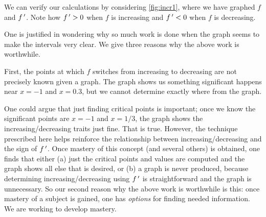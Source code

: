 \begin{example}

We can verify our calculations by considering \autoref{fig:incr1}, where we have graphed $f$ and $f\,'$. Note how $f\,'>0$ when $f$ is increasing and $f\,'<0$ when $f$ is decreasing.
\end{example}

One is justified in wondering why so much work is done when the graph seems to make the intervals very clear. We give three reasons why the above work is worthwhile.

First, the points at which $f$ switches from increasing to decreasing are not precisely known given a graph. The graph shows us something significant happens near $x=-1$ and $x=0.3$, but we cannot determine exactly where from the graph. 

One could argue that just finding critical points is important; once we know the significant points are $x=-1$ and $x=1/3$, the graph shows the increasing/decreasing traits just fine. That is true. However, the technique prescribed here helps reinforce the relationship between increasing/decreasing and the sign of $f\,'$. Once mastery of this concept (and several others) is obtained, one finds that either (a) just the critical points and values are computed and the graph shows all else that is desired, or (b) a graph is never produced, because determining increasing/decreasing using $f\,'$ is straightforward and the graph is unnecessary. So our second reason why the above work is worthwhile is this: once mastery of a subject is gained, one has \emph{options} for finding needed information. We are working to develop mastery.

